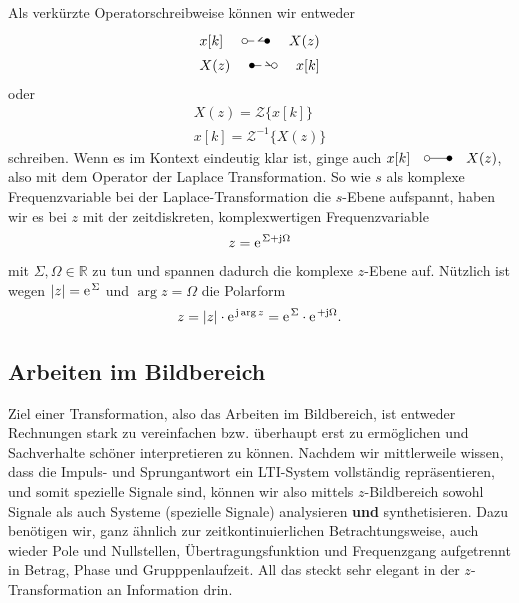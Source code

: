 Als verkürzte Operatorschreibweise können wir entweder
\begin{align}
x[k] \quad\ztransf\quad X(z)\\
X(z) \quad\Ztransf\quad x[k]
\end{align}
oder
\begin{align}
X(z) = \mathcal{Z}\{x[k]\} \\
x[k] = \mathcal{Z}^{-1}\{X(z)\}
\end{align}
schreiben.
Wenn es im Kontext eindeutig klar ist, ginge auch $x[k] \quad\laplace\quad X(z)$,
also mit dem Operator der Laplace Transformation.
%
So wie $s$ als komplexe Frequenzvariable bei der Laplace-Transformation die
$s$-Ebene aufspannt, haben wir es bei $z$ mit der zeitdiskreten, komplexwertigen
Frequenzvariable
\begin{align}
z = \e^{\Sigma + \im \Omega} %
\end{align}
mit $\Sigma,\Omega\in\mathbb{R}$ zu tun und spannen dadurch die komplexe $z$-Ebene auf.
%
Nützlich ist wegen $|z|=\e^{\Sigma}$ und $\arg z = \Omega$ die Polarform
\begin{align}
z = |z| \cdot \e^{\im \arg z} = \e^{\Sigma} \cdot \e^{+\im \Omega}.
\end{align}

\subsection*{Arbeiten im Bildbereich}
Ziel einer Transformation, also das Arbeiten im Bildbereich, ist
entweder Rechnungen stark zu vereinfachen bzw. überhaupt erst zu ermöglichen und
Sachverhalte schöner interpretieren zu können.
%
Nachdem wir mittlerweile wissen, dass die Impuls- und Sprungantwort ein LTI-System
vollständig repräsentieren, und somit spezielle
Signale sind, können wir also mittels $z$-Bildbereich sowohl Signale als auch Systeme (spezielle Signale)
analysieren \textbf{und} synthetisieren.
%
Dazu benötigen wir, ganz ähnlich zur zeitkontinuierlichen Betrachtungsweise, auch
wieder Pole und Nullstellen, Übertragungsfunktion und Frequenzgang aufgetrennt
in Betrag, Phase und Grupppenlaufzeit.
%
All das steckt sehr elegant in der $z$-Transformation an Information drin.
%
